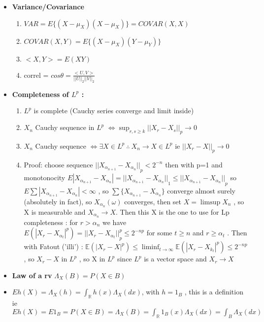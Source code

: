 \documentclass[10pt,landscape,a4paper]{article}
\begin{document}
\begin{multicols*}{3}
\begin{spacing}{0.5}
\begin{itemize}
\item \textbf{Variance/Covariance }

\begin{enumerate}
\item $VAR=E\big \{ (X-\mu_X)(X-\mu_X)\big \}=COVAR(X,X)$
\item $COVAR(X,Y)=E \big \{(X-\mu_X)(Y-\mu_Y) \big \}$
\item $<X,Y>=E(XY)$
\item  correl = $cos \theta = \frac{<U,V>}{ {||U||}_2 {||V||}_2 }$
\end{enumerate}

\item \textbf{Completeness of $L^p$ : } 
\begin{enumerate}
\item $L^p$ is complete (Cauchy series converge and limit inside) 
\item $X_n$ Cauchy sequence in $L^p$ $\Leftrightarrow \sup_{r,s \ge k} {||X_r - X_s||}_p \rightarrow 0$
\item $X_n$ Cauchy sequence $\Leftrightarrow \exists X \in L^p\ \wasytherefore\ X_n \rightarrow X \in L^p$ ie ${||X_r -X ||}_p \rightarrow 0$
\item Proof: choose sequence ${||X_{\alpha_{n+1}} - X_{\alpha_n}||}_p < 2^{-n}$ then with p=1 and monotonocity $E|X_{\alpha_{n+1}} - X_{\alpha_n}| = {|| X_{\alpha_{n+1}} - X_{\alpha_n} ||}_1 \le {|| X_{\alpha_{n+1}} - X_{\alpha_n} ||}_p $ so $E \sum |X_{\alpha_{n+1}} - X_{\alpha_n}| < \infty$ , so $\sum \big \{ X_{\alpha_{n+1}} - X_{\alpha_{n}} \big \}$ converge almost surely (absolutely in fact), so $X_{\alpha_n}(\omega)$ converges, then set $X = \limsup X_n$ , so X is measurable and $X_{\alpha_n}\rightarrow X$. Then this X is the one to use for Lp completeness : for $r > \alpha_{n}$ we have  $E(|X_r-X_{\alpha_{t}}|^p) = {|| X_r - X_{\alpha_{t}} || }_p^p \le 2^{-np}$ for some $t \ge n$ and $r \ge \alpha_{t} $ . Then with Fatout ('illi') : $\mathbb{E}(|X_r-X|^p)\leq \liminf_{t\to\infty}\mathbb{E}(|X_r-X_{k_t}|^p)\leq 2^{-np}$, so $X_r-X$ in $L^p$ ,  so  X in $L^p$ since $L^p$ is a vector space and  $X_r \rightarrow X$


\end{enumerate}

\item \textbf{Law of a rv} \colorbox{green!10}{$\Lambda_X(B)=P(X \in B)$ }

\item $Eh(X)=\Lambda_X(h)=\int_{\mathbb{R}} h(x) \Lambda_X(dx)$, with $h=1_B$ , this is a definition ie  $Eh(X)=E1_B=P(X \in B)=\Lambda_X(B)= \int_{\mathbb{R}} 1_B(x) \Lambda_X(dx) = \int_{B} \Lambda_X(dx)$


\end{itemize}
\end{spacing}
\end{multicols*}
\end{document}
